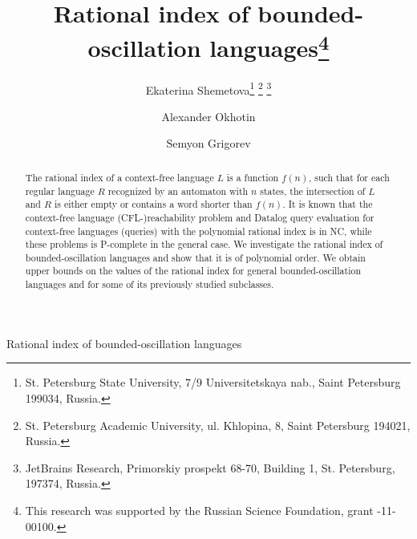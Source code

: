 \documentclass{ws-ijfcs}
\begin{document}
{Rational index of bounded-oscillation languages}

%
\catchline{}{}{}{}{}
%

\title{Rational index of bounded-oscillation languages\footnote{
This research was supported by the Russian Science Foundation, grant -11-00100.}}

\author{Ekaterina Shemetova\footnote{
St. Petersburg State University, 
7/9 Universitetskaya nab., Saint Petersburg 199034, Russia.}
\footnote{
St. Petersburg Academic University, 
ul. Khlopina, 8, Saint Petersburg 194021, Russia.}
\footnote{
JetBrains Research,
Primorskiy prospekt 68-70, Building 1, St. Petersburg, 197374, Russia.}
}

\address{
}

\author{Alexander Okhotin\footnotemark[2] }

\address{
}

\author{Semyon Grigorev\footnotemark[2] \footnotemark[4] }

\address{
}


\maketitle

\begin{history}
\end{history}

\begin{abstract}
The rational index of a context-free language  $L$ is a function $f(n)$, such that for each regular language $R$ recognized by an automaton with $n$ states, the intersection of $L$ and $R$ is either empty or contains a word shorter than $f(n)$. It is known that the context-free language (CFL-)reachability problem and Datalog query evaluation for context-free languages (queries) with the polynomial rational index is in NC, while these problems is P-complete in the general case. We investigate the rational index of bounded-oscillation languages and show that it is of polynomial order. We obtain upper bounds on the values of the rational index for general bounded-oscillation languages and for some of its previously studied subclasses.
\end{abstract}
\end{document}
